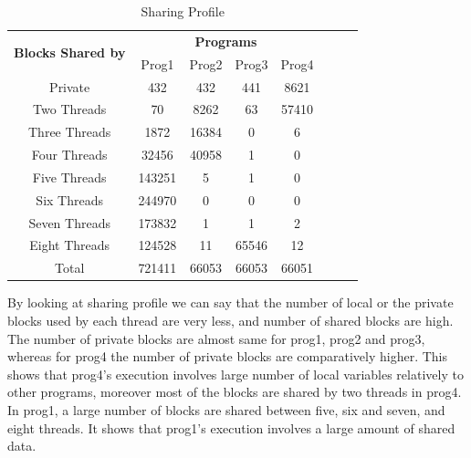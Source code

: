 \documentclass[12pt,oneside,reqno]{amsart}
\begin{document}
\begin{table}[h]

\begin{tabular}{llllllll}
\\
\hline
\multicolumn{1}{|c|}{\multirow{2}{*}{\textbf{Blocks Shared by}}} &
  \multicolumn{4}{c|}{\textbf{Programs}} \\
   \cline{2-5}
\multicolumn{1}{|c|}{} &
  \multicolumn{1}{c|}{Prog1} &
  \multicolumn{1}{c|}{Prog2} &
  \multicolumn{1}{c|}{Prog3} &
  \multicolumn{1}{c|}{Prog4} \\
  \hline
\multicolumn{1}{|c|}{Private} &
  \multicolumn{1}{c|}{432} &
  \multicolumn{1}{c|}{432} &
  \multicolumn{1}{c|}{441} &
  \multicolumn{1}{c|}{8621}  \\
\multicolumn{1}{|c|}{Two Threads} &
  \multicolumn{1}{c|}{70} &
  \multicolumn{1}{c|}{8262} &
  \multicolumn{1}{c|}{63} &
  \multicolumn{1}{c|}{57410}  \\
\multicolumn{1}{|c|}{Three Threads} &
  \multicolumn{1}{c|}{1872} &
  \multicolumn{1}{c|}{16384} &
  \multicolumn{1}{c|}{0} &
  \multicolumn{1}{c|}{6} \\
\multicolumn{1}{|c|}{Four Threads} &
  \multicolumn{1}{c|}{32456} &
  \multicolumn{1}{c|}{40958} &
  \multicolumn{1}{c|}{1} &
  \multicolumn{1}{c|}{0}  \\
\multicolumn{1}{|c|}{Five Threads} &
  \multicolumn{1}{c|}{143251} &
  \multicolumn{1}{c|}{5} &
  \multicolumn{1}{c|}{1} &
  \multicolumn{1}{c|}{0} \\
\multicolumn{1}{|c|}{Six Threads} &
  \multicolumn{1}{c|}{244970} &
  \multicolumn{1}{c|}{0} &
  \multicolumn{1}{c|}{0} &
  \multicolumn{1}{c|}{0}  \\
  \multicolumn{1}{|c|}{Seven Threads} &
  \multicolumn{1}{c|}{173832} &
  \multicolumn{1}{c|}{1} &
  \multicolumn{1}{c|}{1} &
  \multicolumn{1}{c|}{2}   \\
  \multicolumn{1}{|c|}{Eight Threads} &
  \multicolumn{1}{c|}{124528} &
  \multicolumn{1}{c|}{11} &
  \multicolumn{1}{c|}{65546} &
  \multicolumn{1}{c|}{12}  \\
  \hline
  \multicolumn{1}{|c|}{Total} &
  \multicolumn{1}{c|}{721411} &
  \multicolumn{1}{c|}{66053} &
  \multicolumn{1}{c|}{66053} &
  \multicolumn{1}{c|}{66051}\\
  \hline
\end{tabular}
 \caption{Sharing Profile}
\end{table}
 \smallskip
By looking at sharing profile we can say that the number of local or the private blocks used by each thread are very less, and number of shared blocks are high. The number of private blocks are almost same for prog1, prog2 and prog3,  whereas for prog4 the number of private blocks are comparatively higher. This shows that prog4's execution involves large number of local variables relatively to other programs, moreover most of the blocks are shared by two threads in prog4. \\

In prog1, a large number of blocks are shared between five, six and seven, and eight threads. It shows that prog1's execution involves a large amount of shared data.
\end{document}
